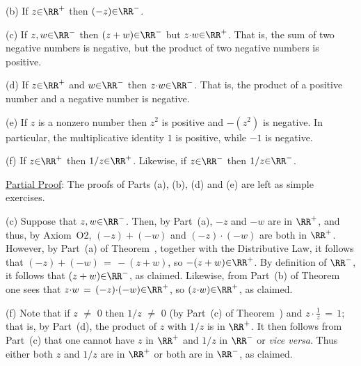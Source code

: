 \V

        (b) If $z{\in}{\RR}^{+}$ then $(-z){\in}{\RR}^{-}$.

\V

        (c) If $z,w{\in}{\RR}^{-}$ then $(z+w){\in}{\RR}^{-}$ but $z{\cdot}w{\in}{\RR}^{+}$.
    That is, the sum of two negative numbers is negative, but the product of two negative numbers is positive.

\V

        (d) If $z{\in}{\RR}^{+}$ and $w{\in}{\RR}^{-}$ then $z{\cdot}w{\in}{\RR}^{-}$.
    That is, the product of a positive number and a negative number is negative.

\V

        (e) If $z$ is a nonzero number then $z^{2}$ is positive and $-(z^{2})$ is negative.
    In particular, the multiplicative identity $1$ is positive, while $-1$ is negative.

\V

        (f) If $z{\in}{\RR}^{+}$ then $1/z{\in}{\RR}^{+}$.
    Likewise, if $z{\in}{\RR}^{-}$ then $1/z{\in}{\RR}^{-}$.

\V

        \underline{Partial Proof}: The proofs of Parts (a), (b), (d) and (e) are left as simple exercises. %

\V

        (c) Suppose that $z,w{\in}{\RR}^{-}$. Then, by Part~(a), $-z$ and $-w$ are in ${\RR}^{+}$, and thus, by Axiom~O2, $(-z)+(-w)$ and $(-z){\cdot}(-w)$ are both in ${\RR}^{+}$.
    However, by Part~(a) of Theorem~, together with the Distributive Law,
    it follows that $(-z)+(-w) \,=\, -(z+w)$, so $-(z+w){\in}{\RR}^{+}$.
    By definition of ${\RR}^{-}$, it follows that $(z+w){\in}{\RR}^{-}$, as claimed.
    Likewise, from Part~(b) of Theorem~ one sees that $z{\cdot}w \,=\, (-z){\cdot}(-w){\in}{\RR}^{+}$,
    so $(z{\cdot}w){\in}{\RR}^{+}$, as claimed.

\V


        (f) Note that if $z \,\,{\neq}\,\, 0$ then $1/z \,\,{\neq}\,\, 0$ (by Part~(c) of Theorem~) and $z{\cdot}{\displaystyle \frac{1}{z}} \,=\, 1$;
    that is, by Part~(d), the product of $z$ with $1/z$ is in ${\RR}^{+}$.
    It then follows from Part~(c) that one cannot have $z$ in ${\RR}^{+}$ and $1/z$ in ${\RR}^{-}$ or {\em vice versa}.
    Thus either both $z$ and $1/z$ are in ${\RR}^{+}$ or both are in ${\RR}^{-}$, as claimed.

\V

